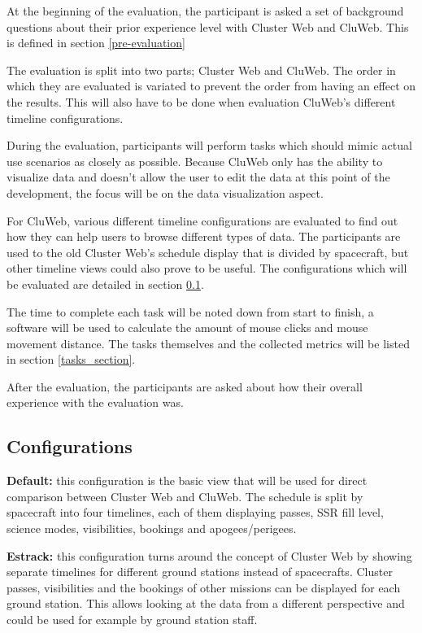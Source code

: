 At the beginning of the evaluation, the participant is asked a set of background questions about their prior experience level with Cluster Web and CluWeb. This is defined in section \ref{pre-evaluation}

The evaluation is split into two parts; Cluster Web and CluWeb. The order in which they are evaluated is variated to prevent the order from having an effect on the results. This will also have to be done when evaluation CluWeb's different timeline configurations.

During the evaluation, participants will perform tasks which should mimic actual use scenarios as closely as possible. Because CluWeb only has the ability to visualize data and doesn't allow the user to edit the data at this point of the development, the focus will be on the data visualization aspect. 

For CluWeb, various different timeline configurations are evaluated to find out how they can help users to browse different types of data. The participants are used to the old Cluster Web's schedule display that is divided by spacecraft, but other timeline views could also prove to be useful. The configurations which will be evaluated are detailed in section \ref{configurations_section}. 

The time to complete each task will be noted down from start to finish, a software will be used to calculate the amount of mouse clicks and mouse movement distance. The tasks themselves and the collected metrics will be listed in section \ref{tasks_section}.

After the evaluation, the participants are asked about how their overall experience with the evaluation was. 

\subsection{Configurations} \label{configurations_section}

\textbf{Default:} this configuration is the basic view that will be used for direct comparison between Cluster Web and CluWeb. The schedule is split by spacecraft into four timelines, each of them displaying passes, SSR fill level, science modes, visibilities, bookings and apogees/perigees.

\textbf{Estrack:} this configuration turns around the concept of Cluster Web by showing separate timelines for different ground stations instead of spacecrafts. Cluster passes, visibilities and the bookings of other missions can be displayed for each ground station. This allows looking at the data from a different perspective and could be used for example by ground station staff.

